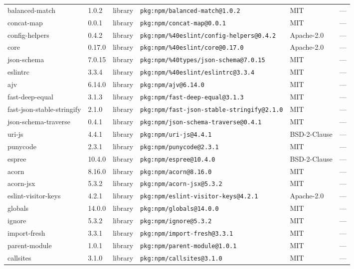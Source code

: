 \documentclass[11pt]{article}
\begin{document}
\begin{longtable}{|l|l|l|p{2.2cm}|l|p{4cm}|}
balanced-match & 1.0.2 & library & \texttt{pkg:npm/balanced-match@1.0.2} & MIT & — \\
concat-map & 0.0.1 & library & \texttt{pkg:npm/concat-map@0.0.1} & MIT & — \\
config-helpers & 0.4.2 & library & \texttt{pkg:npm/\%40eslint/config-helpers@0.4.2} & Apache-2.0 & — \\
core & 0.17.0 & library & \texttt{pkg:npm/\%40eslint/core@0.17.0} & Apache-2.0 & — \\
json-schema & 7.0.15 & library & \texttt{pkg:npm/\%40types/json-schema@7.0.15} & MIT & — \\
eslintrc & 3.3.4 & library & \texttt{pkg:npm/\%40eslint/eslintrc@3.3.4} & MIT & — \\
ajv & 6.14.0 & library & \texttt{pkg:npm/ajv@6.14.0} & MIT & — \\
fast-deep-equal & 3.1.3 & library & \texttt{pkg:npm/fast-deep-equal@3.1.3} & MIT & — \\
fast-json-stable-stringify & 2.1.0 & library & \texttt{pkg:npm/fast-json-stable-stringify@2.1.0} & MIT & — \\
json-schema-traverse & 0.4.1 & library & \texttt{pkg:npm/json-schema-traverse@0.4.1} & MIT & — \\
uri-js & 4.4.1 & library & \texttt{pkg:npm/uri-js@4.4.1} & BSD-2-Clause & — \\
punycode & 2.3.1 & library & \texttt{pkg:npm/punycode@2.3.1} & MIT & — \\
espree & 10.4.0 & library & \texttt{pkg:npm/espree@10.4.0} & BSD-2-Clause & — \\
acorn & 8.16.0 & library & \texttt{pkg:npm/acorn@8.16.0} & MIT & — \\
acorn-jsx & 5.3.2 & library & \texttt{pkg:npm/acorn-jsx@5.3.2} & MIT & — \\
eslint-visitor-keys & 4.2.1 & library & \texttt{pkg:npm/eslint-visitor-keys@4.2.1} & Apache-2.0 & — \\
globals & 14.0.0 & library & \texttt{pkg:npm/globals@14.0.0} & MIT & — \\
ignore & 5.3.2 & library & \texttt{pkg:npm/ignore@5.3.2} & MIT & — \\
import-fresh & 3.3.1 & library & \texttt{pkg:npm/import-fresh@3.3.1} & MIT & — \\
parent-module & 1.0.1 & library & \texttt{pkg:npm/parent-module@1.0.1} & MIT & — \\
callsites & 3.1.0 & library & \texttt{pkg:npm/callsites@3.1.0} & MIT & — \\

\end{longtable}
\end{document}
